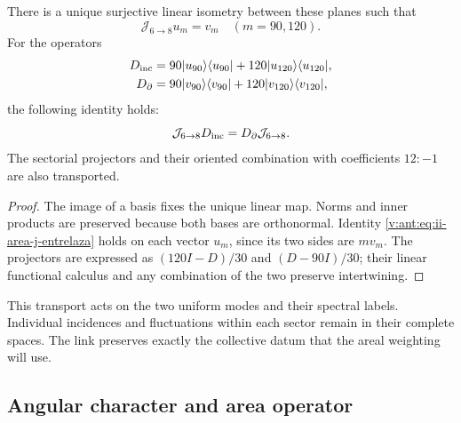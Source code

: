 \begin{theorem}
\label{v:ant:thm:ii-area-entrelazamiento-colectivo}
There is a unique surjective linear isometry between these planes such that
\begin{equation}
 \mathcal J_{6\to8}u_m=v_m\quad(m=90,120).
 \label{v:ant:eq:ii-area-j-colectivo}
\end{equation}
For the operators
\[
 \begin{aligned}
 D_{\rm inc}&=90|u_{90}\rangle\langle u_{90}|
             +120|u_{120}\rangle\langle u_{120}|,\\
 D_\partial&=90|v_{90}\rangle\langle v_{90}|
             +120|v_{120}\rangle\langle v_{120}|,
 \end{aligned}
\]
the following identity holds:
\begin{equation}
 \mathcal J_{6\to8}D_{\rm inc}
 =D_\partial\mathcal J_{6\to8}.
 \label{v:ant:eq:ii-area-j-entrelaza}
\end{equation}
The sectorial projectors and their oriented combination with
coefficients \(12:-1\) are also transported.
\end{theorem}
\begin{proof}
The image of a basis fixes the unique linear map. Norms and
inner products are preserved because both bases are orthonormal.
Identity \eqref{v:ant:eq:ii-area-j-entrelaza} holds on each vector
\(u_m\), since its two sides are \(m v_m\). The projectors are
expressed as \((120I-D)/30\) and \((D-90I)/30\); their linear functional
calculus and any combination of the two preserve intertwining.
\end{proof}

This transport acts on the two uniform modes and their spectral
labels. Individual incidences and fluctuations within
each sector remain in their complete spaces. The link preserves
exactly the collective datum that the areal weighting will use.

\subsection{Angular character and area operator}
\label{v:ant:sec:ii-area-caracter}

